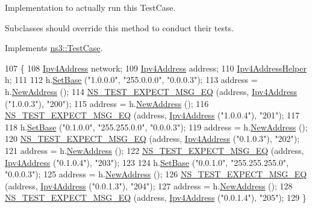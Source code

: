 Implementation to actually run this Test\+Case. 

Subclasses should override this method to conduct their tests. 

Implements \hyperlink{classns3_1_1TestCase_a8ff74680cf017ed42011e4be51917a24}{ns3\+::\+Test\+Case}.


\begin{DoxyCode}
107 \{
108   \hyperlink{classns3_1_1Ipv4Address}{Ipv4Address} network;
109   \hyperlink{classns3_1_1Ipv4Address}{Ipv4Address} address;
110   \hyperlink{classns3_1_1Ipv4AddressHelper}{Ipv4AddressHelper} h;
111 
112   h.\hyperlink{classns3_1_1Ipv4AddressHelper_acf7b16dd25bac67e00f5e25f90a9a035}{SetBase} (\textcolor{stringliteral}{"1.0.0.0"}, \textcolor{stringliteral}{"255.0.0.0"}, \textcolor{stringliteral}{"0.0.0.3"});
113   address = h.\hyperlink{classns3_1_1Ipv4AddressHelper_a9d6bc3cd8def204f9c253fce666b2edd}{NewAddress} ();
114   \hyperlink{group__testing_ga7304ba46a28d8cf08dfdfd6499cf7068}{NS\_TEST\_EXPECT\_MSG\_EQ} (address, \hyperlink{classns3_1_1Ipv4Address}{Ipv4Address} (\textcolor{stringliteral}{"1.0.0.3"}), \textcolor{stringliteral}{"200"});
115   address = h.\hyperlink{classns3_1_1Ipv4AddressHelper_a9d6bc3cd8def204f9c253fce666b2edd}{NewAddress} ();
116   \hyperlink{group__testing_ga7304ba46a28d8cf08dfdfd6499cf7068}{NS\_TEST\_EXPECT\_MSG\_EQ} (address, \hyperlink{classns3_1_1Ipv4Address}{Ipv4Address} (\textcolor{stringliteral}{"1.0.0.4"}), \textcolor{stringliteral}{"201"});
117 
118   h.\hyperlink{classns3_1_1Ipv4AddressHelper_acf7b16dd25bac67e00f5e25f90a9a035}{SetBase} (\textcolor{stringliteral}{"0.1.0.0"}, \textcolor{stringliteral}{"255.255.0.0"}, \textcolor{stringliteral}{"0.0.0.3"});
119   address = h.\hyperlink{classns3_1_1Ipv4AddressHelper_a9d6bc3cd8def204f9c253fce666b2edd}{NewAddress} ();
120   \hyperlink{group__testing_ga7304ba46a28d8cf08dfdfd6499cf7068}{NS\_TEST\_EXPECT\_MSG\_EQ} (address, \hyperlink{classns3_1_1Ipv4Address}{Ipv4Address} (\textcolor{stringliteral}{"0.1.0.3"}), \textcolor{stringliteral}{"202"});
121   address = h.\hyperlink{classns3_1_1Ipv4AddressHelper_a9d6bc3cd8def204f9c253fce666b2edd}{NewAddress} ();
122   \hyperlink{group__testing_ga7304ba46a28d8cf08dfdfd6499cf7068}{NS\_TEST\_EXPECT\_MSG\_EQ} (address, \hyperlink{classns3_1_1Ipv4Address}{Ipv4Address} (\textcolor{stringliteral}{"0.1.0.4"}), \textcolor{stringliteral}{"203"});
123 
124   h.\hyperlink{classns3_1_1Ipv4AddressHelper_acf7b16dd25bac67e00f5e25f90a9a035}{SetBase} (\textcolor{stringliteral}{"0.0.1.0"}, \textcolor{stringliteral}{"255.255.255.0"}, \textcolor{stringliteral}{"0.0.0.3"});
125   address = h.\hyperlink{classns3_1_1Ipv4AddressHelper_a9d6bc3cd8def204f9c253fce666b2edd}{NewAddress} ();
126   \hyperlink{group__testing_ga7304ba46a28d8cf08dfdfd6499cf7068}{NS\_TEST\_EXPECT\_MSG\_EQ} (address, \hyperlink{classns3_1_1Ipv4Address}{Ipv4Address} (\textcolor{stringliteral}{"0.0.1.3"}), \textcolor{stringliteral}{"204"});
127   address = h.\hyperlink{classns3_1_1Ipv4AddressHelper_a9d6bc3cd8def204f9c253fce666b2edd}{NewAddress} ();
128   \hyperlink{group__testing_ga7304ba46a28d8cf08dfdfd6499cf7068}{NS\_TEST\_EXPECT\_MSG\_EQ} (address, \hyperlink{classns3_1_1Ipv4Address}{Ipv4Address} (\textcolor{stringliteral}{"0.0.1.4"}), \textcolor{stringliteral}{"205"});
129 \}
\end{DoxyCode}


